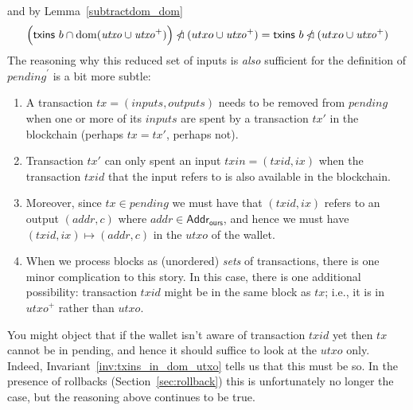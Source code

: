 \documentclass{article}
\DeclareMathOperator{\dom}{dom}
\newcommand{\restrictdom}{\lhd}
\newcommand{\subtractdom}{\mathbin{\slashed{\restrictdom}}}
\begin{document}
%
and by Lemma~\ref{subtractdom_dom}
%
\begin{equation*}
  \Bigl( \mathsf{txins} ~ b \cap \dom (\mathit{utxo} \cup \mathit{utxo}^+) \Bigr) \subtractdom (utxo \cup \mathit{utxo}^+) \\
= \mathsf{txins} ~ b \subtractdom (utxo \cup \mathit{utxo}^+)
\end{equation*}
%
The reasoning why this reduced set of inputs is \emph{also} sufficient for
the definition of $\mathit{pending}^\prime$ is a bit more subtle:
%
\begin{enumerate}

\item A transaction $\mathit{tx} = (\mathit{inputs}, \mathit{outputs})$ needs to
be removed from $\mathit{pending}$ when one or more of its $\mathit{inputs}$ are
spent by a transaction $\mathit{tx}'$ in the blockchain (perhaps $\mathit{tx} =
\mathit{tx}'$, perhaps not).

\item Transaction $\mathit{tx}'$ can only spent an input $\mathit{\mathit{txin}} =
(\mathit{\mathit{txid}}, ix)$ when the transaction $\mathit{\mathit{txid}}$ that
the input refers to is also available in the blockchain.

\item Moreover, since $\mathit{tx} \in \mathit{pending}$ we must have that
$(\mathit{\mathit{txid}}, ix)$ refers to an output $(\mathit{addr}, c)$
where $\mathit{addr} \in \mathsf{Addr}_\mathsf{ours}$, and hence we must have
$(\mathit{\mathit{txid}}, ix) \mapsto (\mathit{addr}, c)$ in the
$\mathit{\mathit{utxo}}$ of the wallet.

\item When we process blocks as (unordered) \emph{sets} of transactions, there is
one minor complication to this story. In this case, there is one additional
possibility: transaction $\mathit{\mathit{txid}}$ might be in the same block as
$\mathit{tx}$; i.e., it is in $\mathit{utxo}^+$ rather than $\mathit{utxo}$.

\end{enumerate}

You might object that if the wallet isn't aware of transaction
$\mathit{\mathit{txid}}$ yet then $\mathit{tx}$ cannot be in pending, and hence
it should suffice to look at the $\mathit{utxo}$ only. Indeed,
Invariant~\ref{inv:txins_in_dom_utxo} tells us that this must be so. In the presence of
rollbacks (Section~\ref{sec:rollback}) this is unfortunately no longer the case,
but the reasoning above continues to be true.
\end{document}
